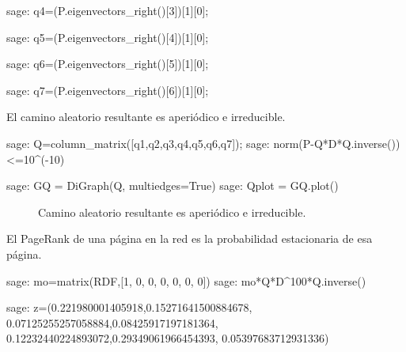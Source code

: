 \begin{sagecommandline}
    sage: q4=(P.eigenvectors_right()[3])[1][0];
\end{sagecommandline}

\begin{sagecommandline}
    sage: q5=(P.eigenvectors_right()[4])[1][0];
\end{sagecommandline}

\begin{sagecommandline}
    sage: q6=(P.eigenvectors_right()[5])[1][0];
\end{sagecommandline}

\begin{sagecommandline}
    sage: q7=(P.eigenvectors_right()[6])[1][0];
\end{sagecommandline}

\par El camino aleatorio resultante es aperiódico e irreducible.

\begin{sagecommandline}
    sage: Q=column_matrix([q1,q2,q3,q4,q5,q6,q7]);
    sage: norm(P-Q*D*Q.inverse())<=10^(-10)
\end{sagecommandline}
\begin{sagecommandline}
    sage: GQ = DiGraph(Q, multiedges=True)
    sage: Qplot = GQ.plot()
\end{sagecommandline}
\begin{figure}[H]
    \centering
    \label{caminoZ}
    \caption{Camino aleatorio resultante es aperiódico e irreducible.}
\end{figure}

\par El PageRank de una página en la red es la probabilidad estacionaria de esa página.
    
\begin{sagecommandline}
    sage: mo=matrix(RDF,[1, 0, 0, 0, 0, 0, 0])
    sage: mo*Q*D^100*Q.inverse()
\end{sagecommandline}

\begin{sagecommandline}
    sage: z=(0.221980001405918,0.15271641500884678, 0.07125255257058884,0.08425917197181364, 0.12232440224893072,0.29349061966454393, 0.05397683712931336)
\end{sagecommandline}

